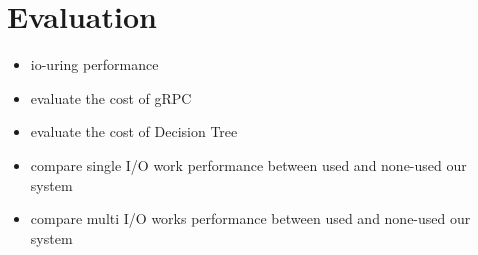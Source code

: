 \documentclass[conference]{IEEEtran}
\begin{document}





\section{Evaluation}
\begin{itemize}
    \item io-uring performance
    \item evaluate the cost of gRPC
    \item evaluate the cost of Decision Tree
    \item compare single I/O work performance between used and none-used our system 
    \item compare multi I/O works performance between used and none-used our system 
\end{itemize}
\end{document}
